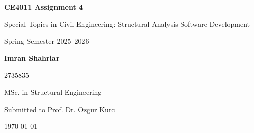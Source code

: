 \documentclass[12pt,a4paper]{report}
\begin{document}
\begin{titlepage}
    \centering
    \vspace*{2.5cm}

    {\Large \textbf{CE4011 Assignment 4} \par}
    \vspace{0.8cm}

    {\large Special Topics in Civil Engineering: Structural Analysis Software Development \par}
    \vspace{0.6cm}

    {\large Spring Semester 2025--2026 \par}
    \vfill

    {\large \textbf{Imran Shahriar} \par}
    \vspace{0.3cm}
    {\large 2735835 \par}
    \vspace{0.3cm}
    {\large MSc. in Structural Engineering \par}
    \vspace{1.2cm}

    {\large Submitted to Prof. Dr. Ozgur Kurc \par}
    \vfill

    {\large \today \par}
\end{titlepage}

\tableofcontents
\listoffigures
\listoftables
\clearpage







\end{document}
